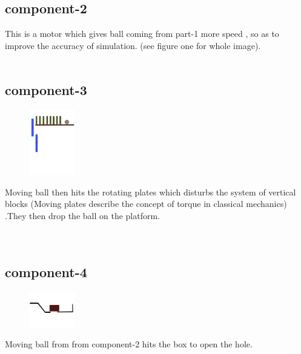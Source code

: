 \documentclass{article}
\begin{document}
\subsection{component-2}
This is a motor which gives ball coming from part-1 more speed , so as to improve the accuracy of simulation. (see figure one for whole image).\\
\\


\subsection{component-3}

\begin{figure}
    \centering
    \vspace{-20pt}
    \includegraphics[width=0.18\textwidth]{p3}
\end{figure}
Moving ball then hits the rotating plates which disturbs the system of vertical blocks (Moving plates describe the concept of torque in classical mechanics\cite{eq2}) .They then drop the ball on the platform.\\
\\
\\

\subsection{component-4}

\begin{figure}
    \centering
    \vspace{-20pt}
    \includegraphics[width=0.18\textwidth]{p4}
\end{figure}
Moving ball from from component-2 hits the box to open the hole. 
\\
\\
\\
\end{document}
